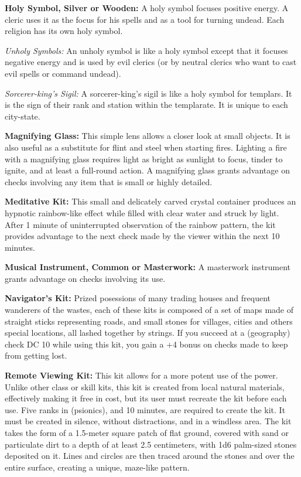 \textbf{Holy Symbol, Silver or Wooden:} A holy symbol focuses positive energy. A cleric uses it as the focus for his spells and as a tool for turning undead. Each religion has its own holy symbol.

 \textit{Unholy Symbols:} An unholy symbol is like a holy symbol except that it focuses negative energy and is used by evil clerics (or by neutral clerics who want to cast evil spells or command undead).

 \textit{Sorcerer-king's Sigil:} A sorcerer-king's sigil is like a holy symbol for templars. It is the sign of their rank and station within the templarate. It is unique to each city-state.

\textbf{Magnifying Glass:} This simple lens allows a closer look at small objects. It is also useful as a substitute for flint and steel when starting fires. Lighting a fire with a magnifying glass requires light as bright as sunlight to focus, tinder to ignite, and at least a full-round action. A magnifying glass grants advantage on  checks involving any item that is small or highly detailed.

\textbf{Meditative Kit:} This small and delicately carved crystal container produces an hypnotic rainbow-like effect while filled with clear water and struck by light. After 1 minute of uninterrupted observation of the rainbow pattern, the kit provides advantage to the next  check made by the viewer within the next 10 minutes.

\textbf{Musical Instrument, Common or Masterwork:} A masterwork instrument grants advantage on  checks involving its use.

\textbf{Navigator's Kit:} Prized posessions of many trading houses and frequent wanderers of the wastes, each of these kits is composed of a set of maps made of straight sticks representing roads, and small stones for villages, cities and others special locations, all lashed together by strings. If you succeed at a  (geography) check DC 10 while using this kit, you gain a +4 bonus on  checks made to keep from getting lost.

\textbf{Remote Viewing Kit:} This kit allows for a more potent use of the  power. Unlike other class or skill kits, this kit is created from local natural materials, effectively making it free in cost, but its user must recreate the kit before each use. Five ranks in  (psionics), and 10 minutes, are required to create the kit. It must be created in silence, without distractions, and in a windless area. The kit takes the form of a 1.5-meter square patch of flat ground, covered with sand or particulate dirt to a depth of at least 2.5 centimeters, with 1d6 palm-sized stones deposited on it. Lines and circles are then traced around the stones and over the entire surface, creating a unique, maze-like pattern.

